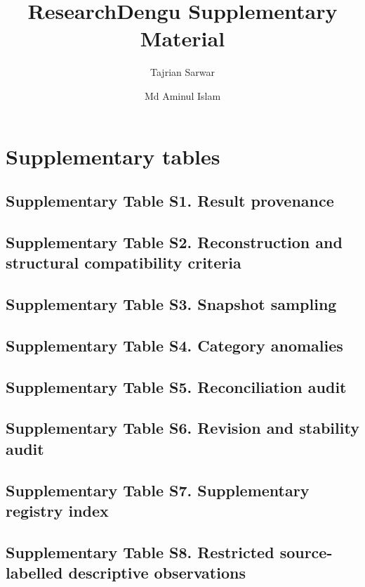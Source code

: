 \documentclass[10pt]{article}
\title{ResearchDengu Supplementary Material}
\author{Tajrian Sarwar \and Md Aminul Islam}
\date{}
\begin{document}
\maketitle
\section*{Supplementary tables}

\subsection*{Supplementary Table S1. Result provenance}


\subsection*{Supplementary Table S2. Reconstruction and structural compatibility criteria}


\subsection*{Supplementary Table S3. Snapshot sampling}


\clearpage
\begin{landscape}
\subsection*{Supplementary Table S4. Category anomalies}

\subsection*{Supplementary Table S5. Reconciliation audit}

\subsection*{Supplementary Table S6. Revision and stability audit}

\subsection*{Supplementary Table S7. Supplementary registry index}

\subsection*{Supplementary Table S8. Restricted source-labelled descriptive observations}

\end{landscape}
\end{document}
